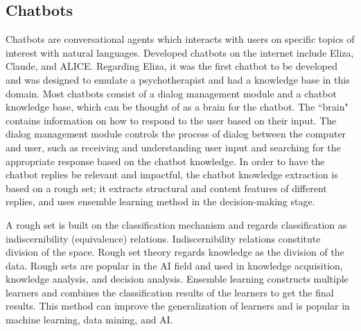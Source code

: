 \documentclass[11pt,technote,twocolumn]{IEEEtran}
\begin{document}
\subsection{Chatbots}
Chatbots are conversational agents which interacts with users on specific topics of interest with natural languages. Developed chatbots on the internet include Eliza, Claude, and ALICE. Regarding Eliza, it was the first chatbot to be developed and was designed to emulate a psychotherapist and had a knowledge base in this domain. Most chatbots consist of a dialog management module and a chatbot knowledge base, which can be thought of as a brain for the chatbot. The ``brain" contains information on how to respond to the user based on their input. The dialog management module controls the process of dialog between the computer and user, such as receiving and understanding user input and searching for the appropriate response based on the chatbot knowledge. In order to have the chatbot replies be relevant and impactful, the chatbot knowledge extraction is based on a rough set; it extracts structural and content features of different replies, and uses ensemble learning method in the decision-making stage. \cite{4663330}
\par
A rough set is built on the classification mechanism and regards classification as indiscernibility (equivalence) relations. Indiscernibility relations constitute division of the space. Rough set theory regards knowledge as the division of the data. Rough sets are popular in the AI field and used in knowledge acquisition, knowledge analysis, and decision analysis. Ensemble learning constructs multiple learners and combines the classification results of the learners to get the final results. This method can improve the generalization of learners and is popular in machine learning, data mining, and AI.
\end{document}
